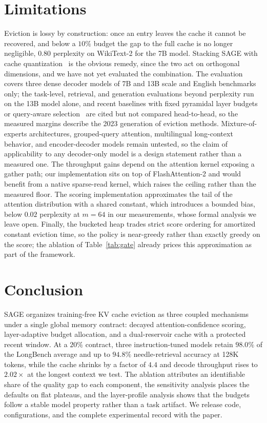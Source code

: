 \section{Limitations}\label{sec:limitations}

Eviction is lossy by construction: once an entry leaves the cache it
cannot be recovered, and below a $10\%$ budget the gap to the full
cache is no longer negligible, $0.80$ perplexity on WikiText-2 for the
7B model. Stacking SAGE with cache
quantization~\cite{liu2024kivi} is
the obvious remedy, since the two act on orthogonal dimensions, and we
have not yet evaluated the combination. The evaluation covers three
dense decoder models of 7B and 13B scale and English benchmarks only;
the task-level, retrieval, and generation evaluations beyond perplexity
run on the 13B model alone, and recent baselines with fixed pyramidal
layer budgets or query-aware selection~\cite{zhang2024pyramidkv} are
cited but not compared head-to-head, so the measured margins describe
the 2023 generation of eviction methods. Mixture-of-experts
architectures, grouped-query attention, multilingual long-context
behavior, and encoder-decoder models remain untested, so the claim of
applicability to any decoder-only model is a design statement rather
than a measured one. The throughput
gains depend on the attention kernel exposing a gather path; our
implementation sits on top of FlashAttention-2 and would benefit from
a native sparse-read kernel, which raises the ceiling rather than the
measured floor. The scoring implementation approximates the tail of
the attention distribution with a shared constant, which introduces a
bounded bias, below $0.02$ perplexity at $m = 64$ in our measurements,
whose formal analysis we leave open. Finally, the bucketed heap trades
strict score ordering for amortized constant eviction time, so the
policy is near-greedy rather than exactly greedy on the score; the
ablation of Table~\ref{tab:gate} already prices this approximation as
part of the framework.

\section{Conclusion}\label{sec:conclusion}

SAGE organizes training-free KV cache eviction as three coupled
mechanisms under a single global memory contract: decayed
attention-confidence scoring, layer-adaptive budget allocation, and a
dual-reservoir cache with a protected recent window. At a $20\%$
contract, three instruction-tuned models retain $98.0\%$ of the
LongBench average and up to $94.8\%$ needle-retrieval accuracy at 128K
tokens, while the cache shrinks by a factor of $4.4$ and decode
throughput rises to $2.02\times$ at the longest context we test. The
ablation attributes an identifiable share of the quality gap to each
component, the sensitivity analysis places the defaults on flat
plateaus, and the layer-profile analysis shows that the budgets follow
a stable model property rather than a task artifact. We release code,
configurations, and the complete experimental record with the paper.

